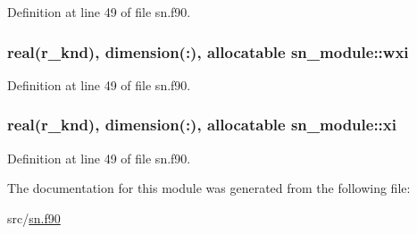 Definition at line 49 of file sn.\-f90.

\hypertarget{classsn__module_aa6da1bff94a27edddbf1b18657999c43}{
\subsubsection[{wxi}]{\setlength{\rightskip}{0pt plus 5cm}real(r\-\_\-knd), dimension(\-:), allocatable sn\-\_\-module\-::wxi}}\label{classsn__module_aa6da1bff94a27edddbf1b18657999c43}


Definition at line 49 of file sn.\-f90.

\hypertarget{classsn__module_ab5621b664bb7f8eb4a3344d4158791a8}{
\subsubsection[{xi}]{\setlength{\rightskip}{0pt plus 5cm}real(r\-\_\-knd), dimension(\-:), allocatable sn\-\_\-module\-::xi}}\label{classsn__module_ab5621b664bb7f8eb4a3344d4158791a8}


Definition at line 49 of file sn.\-f90.



The documentation for this module was generated from the following file\-:\begin{DoxyCompactItemize}
\item 
src/\hyperlink{sn_8f90}{sn.\-f90}\end{DoxyCompactItemize}
